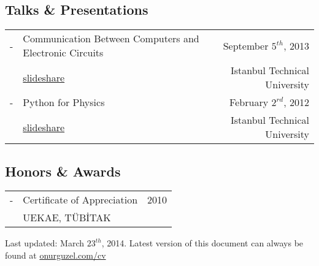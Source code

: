 \documentclass[11pt,a4paper]{article}
\begin{document}
\subsection*{Talks \& Presentations}
\begin{tabularx}{\textwidth}{l X r}
- & Communication Between Computers and Electronic Circuits & September $5^{th}$, 2013\\
& \href{http://www.slideshare.net/onurguzel/bilgisayar-ve-elektronik}{slideshare} & Istanbul Technical University\\
- & Python for Physics & February $2^{rd}$, 2012\\
& \href{http://www.slideshare.net/onurguzel/fizik-icin-python}{slideshare} & Istanbul Technical University
\end{tabularx}

\subsection*{Honors \& Awards}
\begin{tabularx}{\textwidth}{l X r}
- & Certificate of Appreciation & 2010\\
& UEKAE, TÜBİTAK
\end{tabularx}

\vspace{10pt}
\footnotesize {\color[gray]{0.25} Last updated: March $23^{th}$, 2014. Latest version of this document can always be found at \href{http://onurguzel.com/cv}{\color{black}onurguzel.com/cv}}
\end{document}
